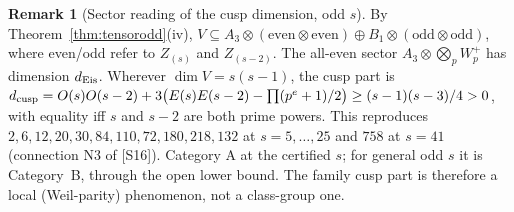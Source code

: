 \documentclass[11pt]{article}
\theoremstyle{definition}
\newtheorem{remark}[theorem]{Remark}
\newcommand{\src}[1]{\textup{[S#1]}}
\begin{document}
\begin{remark}[Sector reading of the cusp dimension, odd $s$]
By Theorem~\ref{thm:tensorodd}(iv), $V\subseteq A_3\otimes(\text{even}\otimes\text{even})\oplus B_1\otimes(\text{odd}\otimes\text{odd})$, where even/odd refer to $Z_{(s)}$ and $Z_{(s-2)}$.
The all-even sector $A_3\otimes\bigotimes_pW_p^+$ has dimension $d_{\rm Eis}$. Wherever $\dim V=s(s-1)$, the cusp part is
$d_{\rm cusp}=O(s)O(s-2)+3\bigl(E(s)E(s-2)-\prod(p^e+1)/2\bigr)\ge(s-1)(s-3)/4>0$, with equality iff $s$ and $s-2$ are both prime powers. This reproduces
$2,6,12,20,30,84,110,72,180,218,132$ at $s=5,\dots,25$ and $758$ at $s=41$ (connection N3 of \src{16}). Category A at the certified $s$; for general odd $s$
it is Category~B, through the open lower bound. The family cusp part is therefore a local (Weil-parity) phenomenon, not a class-group one.
\end{remark}
\end{document}

